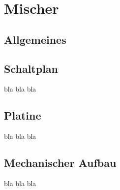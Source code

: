 \chapter{Mischer}
\label{ch:concept}
\section{Allgemeines}


\section{Schaltplan}
bla bla bla

\section{Platine}
bla bla bla

\section{Mechanischer Aufbau}
bla bla bla